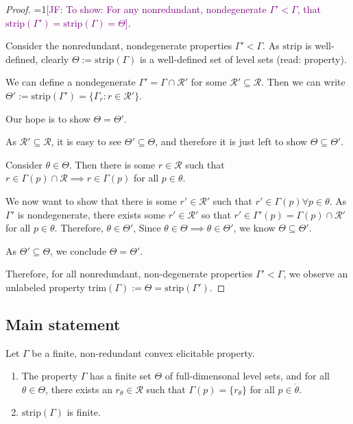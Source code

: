 \documentclass[12pt]{article}
\newcommand{\Comments}{1}
\newcommand{\mynote}[2]{\ifnum\Comments=1\textcolor{#1}{#2}\fi}
\newcommand{\jessie}[1]{\mynote{purple}{[JF: #1]}}
\newcommand{\R}{\mathcal{R}}
\newcommand{\inter}[1]{\mathring{#1}}%
\newcommand{\trim}{\mathrm{trim}}
\newcommand{\strip}{\text{strip}}
\begin{document}
\begin{proof}
\jessie{To show:  For any nonredundant, nondegenerate $\Gamma' < \Gamma$, that $\strip(\Gamma') = \strip(\Gamma) = \Theta$}.

Consider the nonredundant, nondegenerate properties $\Gamma' < \Gamma$.
As $\strip$ is well-defined, clearly $\Theta := \strip(\Gamma)$ is a well-defined set of level sets (read: property).

We can define a nondegenerate $\Gamma' = \Gamma \cap \R'$ for some $\R' \subseteq \R$.
Then we can write $\Theta' := \strip(\Gamma') = \{\Gamma_r : r \in \R' \}$.

Our hope is to show $\Theta = \Theta'$.

As $\R' \subseteq \R$, it is easy to see  $\Theta' \subseteq \Theta$, and therefore it is just left to show $\Theta \subseteq \Theta'$.

Consider $\theta \in \Theta$.
Then there is some $r \in \R$ such that $r\in\Gamma(p)\cap \R \implies r \in \Gamma(p)$ for all $p \in \theta$.

We now want to show that there is some $r' \in \R'$ such that $r' \in \Gamma(p) \forall p \in \theta$.
As $\Gamma'$ is nondegenerate, there exists some $r' \in \R'$ so that $r' \in \Gamma'(p) = \Gamma(p) \cap \R'$ for all $p \in \theta$.
Therefore, $\theta \in \Theta'$,
Since $\theta \in \Theta \implies \theta \in \Theta'$, we know $\Theta \subseteq \Theta'$.

As $\Theta' \subseteq \Theta$, we conclude $\Theta = \Theta'$.

Therefore, for all nonredundant, non-degenerate properties $\Gamma' < \Gamma$, we observe an unlabeled property $\trim(\Gamma) := \Theta = \strip(\Gamma')$.
\end{proof}


\subsection{Main statement}

Let $\Gamma$ be a finite, non-redundant convex elicitable property.

\begin{enumerate}
\item The property $\Gamma$ has a finite set $\Theta$ of full-dimensonal level sets, and for all $\theta \in \Theta$, there exists an $r_\theta \in \R$ such that $\Gamma(p) = \{r_\theta\}$ for all $p \in \inter{\theta}$.
\item $\text{strip}(\Gamma)$ is finite.
\end{enumerate}
\end{document}
